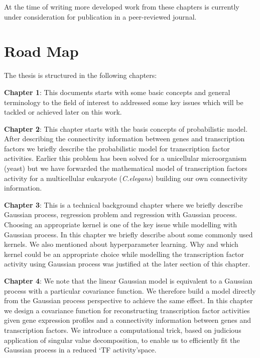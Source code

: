 At the time of writing more developed work from these chapters is currently under consideration for publication in a peer-reviewed journal.

\section{Road Map}
The thesis is structured in the following chapters:

\textbf{Chapter 1}: This documents starts with some basic concepts and general terminology to the field of interest to addressed some key issues which will be tackled or achieved later on this work.

\textbf{Chapter 2}: This chapter starts with the basis concepts of probabilistic model. After describing the connectivity information between genes and transcription factors we briefly describe the probabilistic model for transcription factor activities. Earlier this problem has been solved for a unicellular microorganism (yeast) but we have forwarded the mathematical model of transcription factors activity for a multicellular eukaryote (\textit{C.elegans}) building our own connectivity information.
 
\textbf{Chapter 3}:
This is a technical background chapter where we briefly describe Gaussian process, regression problem and regression with Gaussian process. Choosing an appropriate kernel is one of the key issue while modelling with Gaussian process. In this chapter we briefly describe about some commonly used kernels. We also mentioned about hyperparameter learning. Why and which kernel could be an appropriate choice while modelling the transcription factor activity using Gaussian process was justified at the later section of this chapter.

\textbf{Chapter 4}:
We note that the linear Gaussian model is equivalent to a Gaussian process with a particular covariance function. We therefore build a model directly from the Gaussian process perspective to achieve the same effect. In this chapter we design a covariance function for reconstructing transcription factor activities given gene expression profiles and a connectivity information between genes and transcription factors. We introduce a computational trick, based on  judicious application of singular value decomposition, to enable us to efficiently fit the Gaussian process in a reduced \lq TF activity\rq space. 

